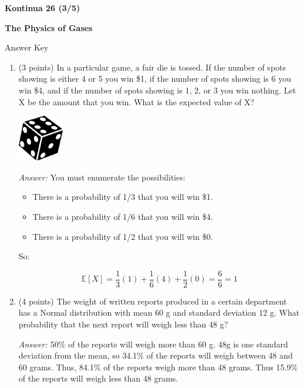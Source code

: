 \documentclass[letterpaper,12pt,addpoints]{exam}
\begin{document}
{\selectfont




\textbf{Kontinua 26 (3/5)}

\Large \textbf{The Physics of Gases}

\vspace{2mm}

Answer Key
} 
\parbox{0.35\textwidth}{

} %


\begin{enumerate}

\item (3 points) In a particular game, a fair die is tossed.  If the number of spots showing is either 4 or 5 you win \$1, if the number of spots showing is 6 you win \$4, and if the number of spots showing is 1, 2, or 3 you win nothing.  Let X be the amount that you win. 
What is the expected value of X?

\vspace{0.2cm}
\begin{center}
\includegraphics[width=2cm]{dice_simple.png}
\end{center}

\textit{Answer:} You must enumerate the possibilities:
\begin{itemize}
\item There is a probability of 1/3 that you will win \$1.  
\item There is a probability of 1/6 that you will win \$4.
\item There is a probability of 1/2 that you will win \$0.
\end{itemize}

So:

$$\mathbb{E}[X] = \frac{1}{3}(1) + \frac{1}{6}(4) +  \frac{1}{2}(0) = \frac{6}{6} = 1 $$

\item (4 points) The weight of written reports produced in a certain department has a Normal distribution with mean 60 g and standard deviation 12 g.  What probability that the next report will weigh less than 48 g?

\textit{Answer:}  50\% of the reports will weigh more than 60 g.  48g is one standard deviation from the mean, so 34.1\% of the reports will weigh between 48 and 60 grams.  Thus,  84.1\% of the reports weigh more than 48 grams.  Thus 15.9\% of the reports will weigh less than 48 grams.


\end{enumerate}
\end{document}
